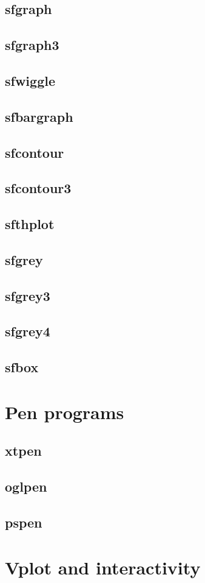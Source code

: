 \subsection{sfgraph}

\subsection{sfgraph3}

\subsection{sfwiggle}

\subsection{sfbargraph}

\subsection{sfcontour}

\subsection{sfcontour3}

\subsection{sfthplot}

\subsection{sfgrey}

\subsection{sfgrey3}

\subsection{sfgrey4}

\subsection{sfbox}

\section{Pen programs}

\subsection{xtpen}

\subsection{oglpen}

\subsection{pspen}

\section{Vplot and interactivity}



